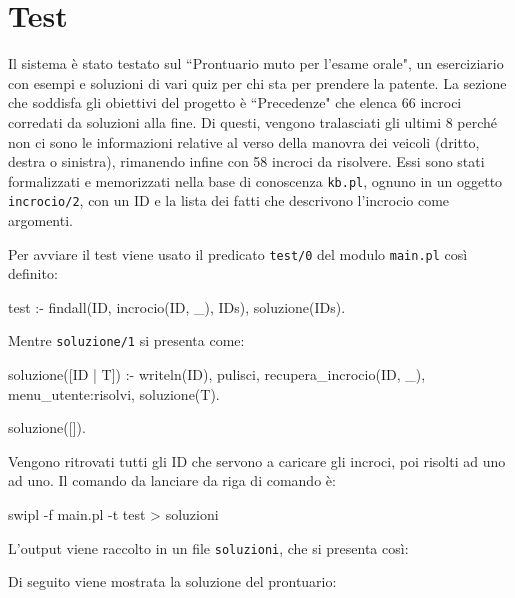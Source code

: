 \chapter{Test}
Il sistema è stato testato sul ``Prontuario muto per l'esame orale"\cite{Prontuario}, un eserciziario con esempi e soluzioni di vari quiz per chi sta per prendere la patente. La sezione che soddisfa gli obiettivi del progetto è ``Precedenze" che elenca 66 incroci corredati da soluzioni alla fine. Di questi, vengono tralasciati gli ultimi 8 perché non ci sono le informazioni relative al verso della manovra dei veicoli (dritto, destra o sinistra), rimanendo infine con 58 incroci da risolvere. Essi sono stati formalizzati e memorizzati nella base di conoscenza \texttt{kb.pl}, ognuno in un oggetto \texttt{incrocio/2}, con un ID e la lista dei fatti che descrivono l'incrocio come argomenti.

Per avviare il test viene usato il predicato \texttt{test/0} del modulo \texttt{main.pl} così definito:


\begin{verbatimtab}
test :-
	findall(ID, incrocio(ID, _), IDs),
	soluzione(IDs).
\end{verbatimtab}

\noindent
Mentre \texttt{soluzione/1} si presenta come:
\begin{verbatimtab}
soluzione([ID | T]) :-
	writeln(ID),
	pulisci,
	recupera_incrocio(ID, _),
	menu_utente:risolvi,
	soluzione(T).

soluzione([]).
\end{verbatimtab}

Vengono ritrovati tutti gli ID che servono a caricare gli incroci, poi risolti ad uno ad uno. Il comando da lanciare da riga di comando è:
\begin{verbatimtab}
swipl -f main.pl -t test > soluzioni
\end{verbatimtab}

\noindent
L'output viene raccolto in un file \texttt{soluzioni}, che si presenta così:
\scriptsize

\normalsize
Di seguito viene mostrata la soluzione del prontuario:


